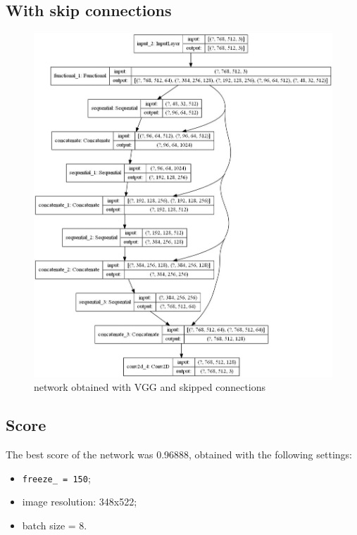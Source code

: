 \documentclass[12pt,a4paper]{report}
\begin{document}
	\subsection{With skip connections}
\begin{figure}[H]
	\includegraphics[scale = .49, center]{vgg_model}
	\caption{network obtained with VGG and skipped connections}
\end{figure}
\subsection{Score}
	The best score of the network was 0.96888, obtained with the following settings:
	\begin{itemize}
		\item	\texttt{freeze\_ = 150};
		\item image resolution: 348x522;
		\item batch size = 8.
	\end{itemize}
\end{document}
